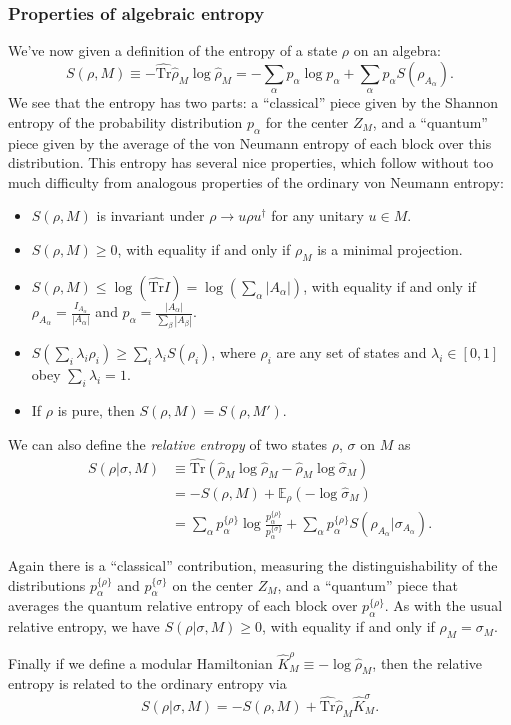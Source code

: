 \documentclass[12pt]{article}
\newcommand{\be}{\begin{equation}}
\newcommand{\ee}{\end{equation}}
\newcommand{\bi}{\begin{itemize}}
\newcommand{\ei}{\end{itemize}}
\newcommand{\Tr}{\mathrm{Tr}}
\begin{document}
\subsubsection{Properties of algebraic entropy}
We've now given a definition of the entropy of a state $\rho$ on an algebra:
\be\label{entropy2}
S(\rho,M)\equiv  -\hat{\Tr}\hat{\rho}_M\log \hat{\rho}_M = -\sum_\alpha p_\alpha \log p_\alpha +\sum_{\alpha}p_\alpha S(\rho_{A_\alpha}).
\ee
We see that the entropy has two parts: a ``classical'' piece given by the Shannon entropy of the probability distribution $p_\alpha$ for the center $Z_M$, and a ``quantum'' piece given by the average of the von Neumann entropy of each block over this distribution.  This entropy has several nice properties, which follow without too much difficulty from analogous properties of the ordinary von Neumann entropy:
\bi
\item $S(\rho,M)$ is invariant under $\rho\to u\rho u^\dagger$ for any unitary $u\in M$.  
\item $S(\rho,M)\geq 0$, with equality if and only if $\rho_M$ is a minimal projection.
\item $S(\rho,M)\leq \log \left(\hat{\Tr} I\right)= \log\left(\sum_\alpha|A_\alpha|\right)$, with equality if and only if $\rho_{A_\alpha}=\frac{I_{A_\alpha}}{|A_\alpha|}$ and $p_\alpha=\frac{|A_\alpha|}{\sum_\beta|A_\beta|}$.
\item $S\left(\sum_i \lambda_i\rho_i\right)\geq \sum_i \lambda_i S\left(\rho_i\right)$, where $\rho_i$ are any set of states and $\lambda_i\in[0,1]$ obey $\sum_i\lambda_i=1$.
\item If $\rho$ is pure, then $S(\rho,M)=S(\rho,M')$.  
\ei
We can also define the \textit{relative entropy} of two states $\rho$, $\sigma$ on $M$ as
\begin{align}\nonumber
S(\rho|\sigma,M)&\equiv \hat{\Tr}\left(\hat{\rho}_M\log \hat{\rho}_M-\hat{\rho}_M\log \hat{\sigma}_M\right)\\\nonumber
&=-S(\rho,M)+\mathbb{E}_\rho\left(-\log \hat{\sigma}_M\right)\\\label{rent}
&=\sum_\alpha p_\alpha^{\{\rho\}} \log \frac{p_\alpha^{\{\rho\}}}{p^{\{\sigma\}}_\alpha}+\sum_\alpha p_\alpha^{\{\rho\}}S\left(\rho_{A_\alpha}|\sigma_{A_\alpha}\right).
\end{align}

Again there is a ``classical'' contribution, measuring the distinguishability of the distributions $p_\alpha^{\{\rho\}}$ and $p^{\{\sigma\}}_\alpha$ on the center $Z_M$, and a ``quantum'' piece that averages the quantum relative entropy of each block over $p^{\{\rho\}}_\alpha$.  As with the usual relative entropy, we have $S(\rho|\sigma,M)\geq0$, with equality if and only if $\rho_M=\sigma_M$.

Finally if we define a modular Hamiltonian $\hat{K}^\rho_M \equiv -\log \hat{\rho}_M$, then the relative entropy is related to the ordinary entropy via 
\be\label{orents}
S(\rho|\sigma,M)=-S(\rho,M)+\hat{\Tr} \hat{\rho}_M \hat{K}^\sigma_M.
\ee



\end{document}
